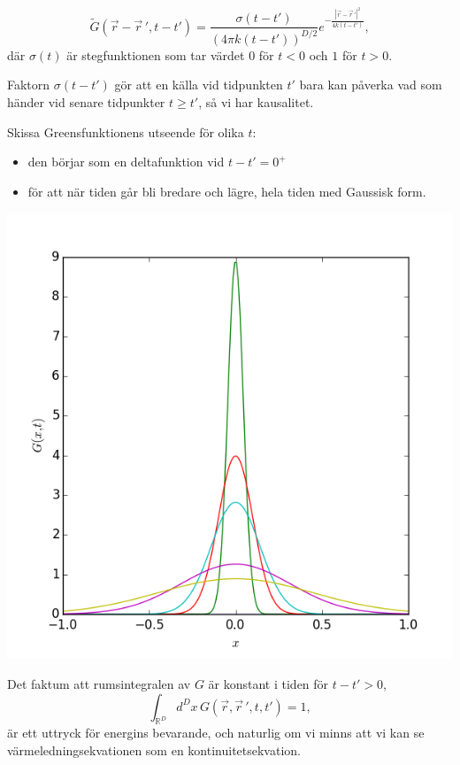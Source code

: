 \documentclass[%
oneside,                 %
final,                   %
10pt]{article}
\newenvironment{warning_mdfboxadmon}[1][]{
\begin{warning_mdfboxmdframed}[frametitle=#1]
}
{
\end{warning_mdfboxmdframed}
}
\begin{document}
\noindent
$$
\tilde G(\vec{r}-\vec{r}\,',t-t')=\frac{\sigma(t-t')}{(4\pi k (t-t'))^{D/2}}
e^{-\frac{|\vec{r}-\vec{r}\,'|^2}{4k(t-t')}},
$$
där $\sigma(t)$ är stegfunktionen som tar värdet $0$ för $t<0$
och $1$ för $t>0$.

Faktorn $\sigma(t-t')$ gör att en källa vid tidpunkten $t'$ bara kan påverka vad som händer vid senare tidpunkter $t\geq t'$, så vi har kausalitet.

Skissa Greensfunktionens utseende för olika $t$:
\begin{itemize}
\item den börjar som en deltafunktion vid $t-t'=0^+$ 

\item för att när tiden går bli bredare och lägre, hela tiden med Gaussisk form. 
\end{itemize}

\noindent
\vspace{6mm}

\centerline{\includegraphics[width=0.95\linewidth]{fig/greens_function_1dim_wtime.png}}

\vspace{6mm}




\begin{warning_mdfboxadmon}[Kommentar]
Det faktum att rumsintegralen av $G$ är konstant i tiden för $t-t'>0$,
$$
\int_{\mathbb{R}^D}d^Dx\,G(\vec{r},\vec{r}\,',t,t')=1,
$$
är ett uttryck för energins bevarande, och naturlig om vi minns att vi kan se värmeledningsekvationen som en kontinuitetsekvation.
\end{warning_mdfboxadmon} %
\end{document}
